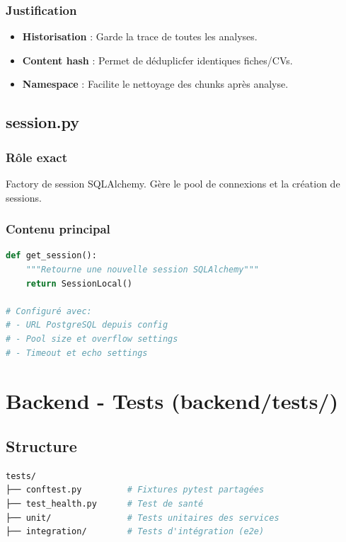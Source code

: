\documentclass[12pt,a4paper,oneside]{book}
\begin{document}
\subsubsection{Justification}

\begin{itemize}
    \item \textbf{Historisation} : Garde la trace de toutes les analyses.
    
    \item \textbf{Content hash} : Permet de déduplicfer identiques fiches/CVs.
    
    \item \textbf{Namespace} : Facilite le nettoyage des chunks après analyse.
\end{itemize}

\subsection{session.py}

\subsubsection{Rôle exact}

Factory de session SQLAlchemy. Gère le pool de connexions et la création de sessions.

\subsubsection{Contenu principal}

\begin{lstlisting}[language=Python]
def get_session():
    """Retourne une nouvelle session SQLAlchemy"""
    return SessionLocal()

# Configuré avec:
# - URL PostgreSQL depuis config
# - Pool size et overflow settings
# - Timeout et echo settings
\end{lstlisting}

\section{Backend - Tests (backend/tests/)}

\subsection{Structure}

\begin{lstlisting}[language=bash]
tests/
├── conftest.py         # Fixtures pytest partagées
├── test_health.py      # Test de santé
├── unit/               # Tests unitaires des services
├── integration/        # Tests d'intégration (e2e)
\end{lstlisting}
\end{document}
